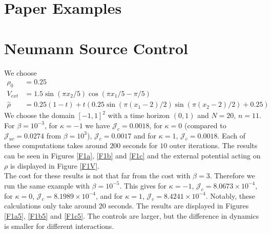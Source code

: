 \documentclass[11pt, a4paper]{article}
\theoremstyle{definition}
\newcommand{\hr}{\widehat \rho}
\begin{document}
	\section*{Paper Examples}
	\section{Neumann Source Control}
	We choose 
	\begin{align*}
		\rho_0 &= 0.25\\
		V_{ext} &= 1.5\sin(\pi x_2/5)\cos(\pi x_1/5 - \pi/5)\\
		\hr &= 0.25(1 - t) + t(0.25\sin(\pi(x_1 - 2)/2)\sin(\pi(x_2 - 2)/2) + 0.25)
	\end{align*}
	We choose the domain $[-1,1]^2$ with a time horizon $(0,1)$ and $N = 20$, $n = 11$. 
	For $\beta = 10^{-3}$, for $\kappa = -1$ we have $\mathcal J_c = 0.0018$, for $\kappa = 0$ (compared to $\mathcal J_{uc} = 0.0274$ from $\beta = 10^3$), $\mathcal J_c = 0.0017$ and for $\kappa = 1$, $\mathcal J_c = 0.0018$. Each of these computations takes around $200$ seconds for $10$ outer iterations. The results can be seen in Figures \ref{F1a}, \ref{F1b} and \ref{F1c} and the external potential acting on $\rho$ is displayed in Figure \ref{F1V}.\\
	The cost for these results is not that far from the cost with $\beta = 3$. Therefore we run the same example with $\beta = 10^{-5}$. This gives for $\kappa = -1$, $\mathcal J_c = 8.0673 \times 10^{-4}$, for $\kappa = 0$, $\mathcal J_c = 8.1989 \times 10^{-4}$, and for $\kappa = 1$, $\mathcal J_c = 8.4241 \times 10^{-4}$. Notably, these calculations only take around $20$ seconds. The results are displayed in Figures \ref{F1a5}, \ref{F1b5} and \ref{F1c5}. The controls are larger, but the difference in dynamics is smaller for different interactions.
	
\end{document}
